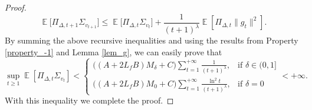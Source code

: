\documentclass{article} %
\DeclareMathOperator{\Expect}{\mathbb{E}}
\begin{document}
\begin{proof}
\[
\Expect\big[\Pi_{\Delta,t+1}\Sigma_{v_{t+1}}\big]\le \Expect\big[\Pi_{\Delta,t}\Sigma_{v_{t}}\big]+\frac{1}{(t+1)^{\lambda}}\Expect[\Pi_{\Delta,t}\|g_{t}\|^{2}].
\]
By summing the above recursive inequalities and using the results from Property \ref{property_-1} and Lemma \ref{lem_g}, we can easily prove that
\[\sup_{t \geq 1} \Expect[\Pi_{\Delta,t}\Sigma_{v_{t}}] < \begin{cases} 
\big((A+2L_{f}B)M_{\delta}+C\big)\sum_{t=1}^{+\infty}\frac{1}{(t+1)^{\lambda}}, & \text{if } \delta \in (0,1] \\
\big((A+2L_{f}B)M_{0}+C\big)\sum_{t=1}^{+\infty}\frac{\ln^{2}t}{(t+1)^{\lambda}}, & \text{if } \delta = 0
\end{cases}<+\infty.\]
With this inequality we complete the proof.
\end{proof}
\end{document}

